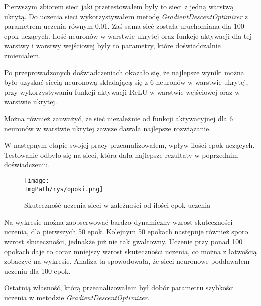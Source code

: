 \documentclass[a4paper,12pt,twoside,openany]{report}
\newcommand{\ImgPath}{.}
\begin{document}
   	Pierwszym zbiorem sieci jaki przetestowałem były to sieci z jedną warstwą ukrytą. Do uczenia sieci wykorzystywałem metodę \textit{GradientDescentOptimizer} z parametrem uczenia równym 0.01. Zaś sama sieć została uruchomiana dla 100 epok uczących. Ilość neuronów w warstwie ukrytej oraz funkcje aktywacji dla tej warstwy i warstwy wejściowej były to parametry, które doświadczalnie zmieniałem.

	
	Po przeprowadzonych doświadczeniach okazało się, że najlepsze wyniki można było uzyskać siecią neuronową składającą się z 6 neuronów w warstwie ukrytej, przy wykorzystywaniu funkcji aktywacji ReLU w warstwie wejściowej oraz w warstwie ukrytej. 
	
	Można również zauważyć, że sieć niezależnie od funkcji aktywacyjnej dla 6 neuronów w warstwie ukrytej zawsze dawała najlepsze rozwiązanie.
	
	W następnym etapie swojej pracy przeanalizowałem, wpływ ilości epok uczących. Testowanie odbyło się na sieci, która dała najlepsze rezultaty w poprzednim doświadczeniu.

	\begin{figure}[H]
		\centering
		{\label{fig:b}\texttt{[image: \\ImgPath/rys/opoki.png]}}
		\caption{Skuteczność uczenia sieci w zależności od ilości epok uczenia}
	\end{figure}

	Na wykresie można zaobserwować bardzo dynamiczny wzrost skuteczności uczenia, dla pierwszych 50 epok. Kolejnym 50 epokach następuje również sporo wzrost skuteczności, jednakże już nie tak gwałtowny. Uczenie przy ponad 100 opokach daje to coraz mniejszy wzrost skuteczności uczenia, co można z łatwością zobaczyć na wykresie. Analiza ta spowodowała, że sieci neuronowe poddawałem uczeniu dla 100 epok.
	
	Ostatnią własność, którą przeanalizowałem był dobór parametru szybkości uczenia w metodzie \textit{GradientDescentOptimizer}.
	
\end{document}
